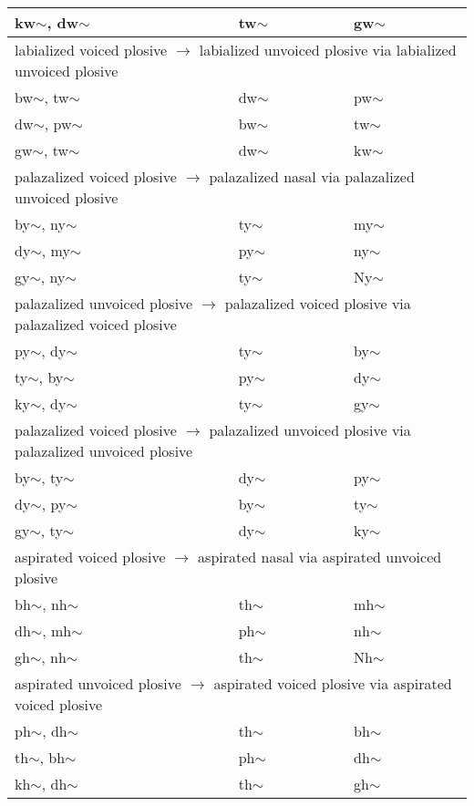 \documentclass[6pt]{article}
\begin{document}
\begin{longtable}{ l | l | l }
kw$\sim$, dw$\sim$ & tw$\sim$ & gw$\sim$ \\
 \hline \multicolumn{3}{l}{labialized voiced plosive $\rightarrow$ labialized unvoiced plosive via labialized unvoiced plosive}\\  \hline
bw$\sim$, tw$\sim$ & dw$\sim$ & pw$\sim$ \\
dw$\sim$, pw$\sim$ & bw$\sim$ & tw$\sim$ \\
gw$\sim$, tw$\sim$ & dw$\sim$ & kw$\sim$ \\
 \hline \multicolumn{3}{l}{palazalized voiced plosive $\rightarrow$  palazalized nasal via palazalized unvoiced plosive}\\  \hline
by$\sim$, ny$\sim$ & ty$\sim$ & my$\sim$ \\
dy$\sim$, my$\sim$ & py$\sim$ & ny$\sim$ \\
gy$\sim$, ny$\sim$ & ty$\sim$ & Ny$\sim$ \\
 \hline \multicolumn{3}{l}{palazalized unvoiced plosive $\rightarrow$ palazalized voiced plosive via palazalized voiced plosive}\\  \hline
py$\sim$, dy$\sim$ & ty$\sim$ & by$\sim$ \\
ty$\sim$, by$\sim$ & py$\sim$ & dy$\sim$ \\
ky$\sim$, dy$\sim$ & ty$\sim$ & gy$\sim$ \\
 \hline \multicolumn{3}{l}{palazalized voiced plosive $\rightarrow$ palazalized unvoiced plosive via palazalized unvoiced plosive}\\  \hline
by$\sim$, ty$\sim$ & dy$\sim$ & py$\sim$ \\
dy$\sim$, py$\sim$ & by$\sim$ & ty$\sim$ \\
gy$\sim$, ty$\sim$ & dy$\sim$ & ky$\sim$ \\
 \hline \multicolumn{3}{l}{aspirated voiced plosive $\rightarrow$  aspirated nasal via aspirated unvoiced plosive}\\  \hline
bh$\sim$, nh$\sim$ & th$\sim$ & mh$\sim$ \\
dh$\sim$, mh$\sim$ & ph$\sim$ & nh$\sim$ \\
gh$\sim$, nh$\sim$ & th$\sim$ & Nh$\sim$ \\
 \hline \multicolumn{3}{l}{aspirated unvoiced plosive $\rightarrow$ aspirated voiced plosive via aspirated voiced plosive}\\  \hline
ph$\sim$, dh$\sim$ & th$\sim$ & bh$\sim$ \\
th$\sim$, bh$\sim$ & ph$\sim$ & dh$\sim$ \\
kh$\sim$, dh$\sim$ & th$\sim$ & gh$\sim$ \\


\end{longtable}
\end{document}
